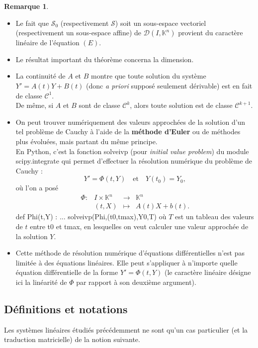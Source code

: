 \documentclass[french]{article}
\newcommand{\K}{\mathbb{K}}
\theoremstyle{plain}
\theoremstyle{definition}
\newtheorem*{rmq}{Remarque}
\theoremstyle{remark}
\begin{document}
\begin{rmq}
	\begin{itemize}
		\item Le fait que $\mathcal{S}_0$ (respectivement $\mathcal{S}$) soit un sous-espace vectoriel (respectivement un sous-espace affine) de $\mathcal{D}(I,\K^n)$ provient du caractère linéaire de l'équation $(E)$.
		\item Le résultat important du théorème concerna la dimension.
		\item La continuité de $A$ et $B$ montre que toute solution du système $Y'=A(t)Y+B(t)$ (donc \textit{a priori} supposé seulement dérivable) est en fait de classe $\mathcal{C}^1$.\\
		De même, si $A$ et $B$ sont de classe $\mathcal{C}^k$, alors toute solution est de classe $\mathcal{C}^{k+1}$.
		\item On peut trouver numériquement des valeurs approchées de la solution d'un tel problème de Cauchy à l'aide de la \textbf{méthode d'Euler} ou de méthodes plus évoluées, mais partant du même principe.\\
		En Python, c'est la fonction solveivp (pour \textit{initial value problem}) du module scipy.integrate qui permet d'effectuer la résolution numérique du problème de Cauchy :
		$$Y'=\Phi(t,Y)\quad\text{et}\quad Y(t_0)=Y_0,$$ où l'on a posé
		$$\begin{array}{lrcl}
			\Phi:&I\times\K^n&\longrightarrow&\K^n\\
			&(t,X)&\longmapsto& A(t)X+b(t).
		\end{array}$$
		def Phi(t,Y) :
		...
		solveivp(Phi,(t0,tmax),Y0,T)
		où $T$ est un tableau des valeurs de $t$ entre t0 et tmax, en lesquelles on veut calculer une valeur approchée de la solution $Y$.
		\item Cette méthode de résolution numérique d'équations différentielles n'est pas limitée à des équations linéaires. Elle peut s'appliquer à n'importe quelle équation différentielle de la forme $Y'=\Phi(t,Y)$ (le caractère linéaire désigne ici la linéarité de $\Phi$ par rapport à son deuxième argument).
	\end{itemize}
\end{rmq}


\subsection{Définitions et notations}

Les systèmes linéaires étudiés précédemment ne sont qu'un cas particulier (et la traduction matricielle) de la notion suivante.
\end{document}
